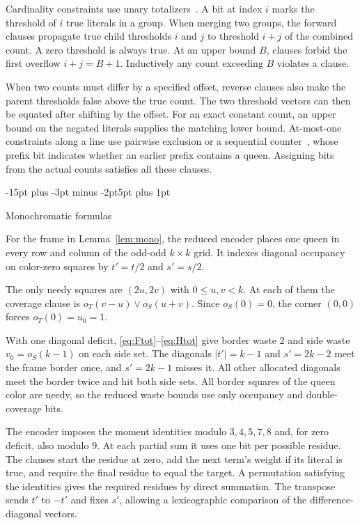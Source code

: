 \documentclass[11pt,a4paper]{article}
\makeatletter
\renewcommand{\subsection}{\@startsection{subsection}{2}{\z@}%
  {-15pt plus -3pt minus -2pt}{5pt plus 1pt}%
  {\normalfont\bfseries\raggedright}}
\theoremstyle{result}
\theoremstyle{definition}
\theoremstyle{remark}
\makeatother
\begin{document}
Cardinality constraints use unary totalizers~\cite{BB2003}.
A bit at index $i$ marks the threshold of $i$ true literals
in a group. When merging two groups, the forward clauses
propagate true child thresholds $i$ and $j$ to threshold $i+j$
of the combined count. A zero threshold is always true. At an
upper bound $B$, clauses forbid the first overflow $i+j=B+1$.
Inductively any count exceeding $B$ violates a clause.

When two counts must differ by a specified offset, reverse
clauses also make the parent thresholds false above the true count.
The two threshold vectors can then be equated after shifting by
the offset. For an exact constant count, an upper bound on the
negated literals supplies the matching lower bound. At-most-one
constraints along a line use pairwise exclusion or a sequential
counter~\cite{Sinz2005}, whose prefix bit indicates whether an
earlier prefix contains a queen. Assigning bits from the actual
counts satisfies all these clauses.

\subsection{Monochromatic formulas}

For the frame in Lemma~\ref{lem:mono}, the reduced encoder
places one queen in every row and column of the odd-odd
$k\times k$ grid. It indexes diagonal occupancy on color-zero
squares by $t'=t/2$ and $s'=s/2$.

The only needy squares are $(2u,2v)$ with $0\le u,v<k$.
At each of them the coverage clause is $o_T(v-u)\lor o_S(u+v)$.
Since $o_S(0)=0$, the corner $(0,0)$ forces $o_T(0)=u_0=1$.

With one diagonal deficit, \eqref{eq:Ftot}--\eqref{eq:Htot}
give border waste $2$ and side waste $v_0=o_S(k-1)$ on
each side set. The diagonals $|t'|=k-1$ and $s'=2k-2$
meet the frame border once, and $s'=2k-1$ misses it.
All other allocated diagonals meet the border twice and
hit both side sets. All border squares of the queen color
are needy, so the reduced waste bounds use only occupancy
and double-coverage bits.

The encoder imposes the moment identities modulo $3,4,5,7,8$
and, for zero deficit, also modulo $9$. At each partial sum it
uses one bit per possible residue. The clauses start the residue
at zero, add the next term's weight if its literal is true, and
require the final residue to equal the target. A permutation
satisfying the identities gives the required residues by direct
summation. The transpose sends $t'$ to $-t'$ and fixes $s'$,
allowing a lexicographic comparison of the difference-diagonal
vectors.
\end{document}
